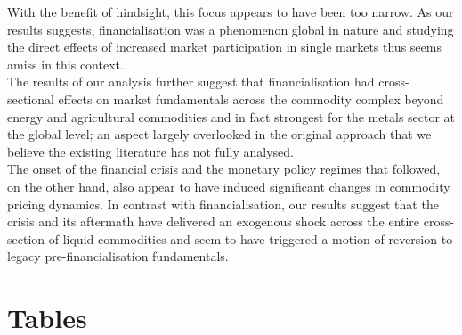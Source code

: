 \documentclass[
  authoryear,
  preprint,
  3p]{elsarticle}
\begin{document}
\medskip

With the benefit of hindsight, this focus appears to have been too
narrow. As our results suggests, financialisation was a phenomenon
global in nature and studying the direct effects of increased market
participation in single markets thus seems amiss in this context.\\
The results of our analysis further suggest that financialisation had
cross-sectional effects on market fundamentals across the commodity
complex beyond energy and agricultural commodities and in fact strongest
for the metals sector at the global level; an aspect largely overlooked
in the original approach that we believe the existing literature has not
fully analysed.\\
The onset of the financial crisis and the monetary policy regimes that
followed, on the other hand, also appear to have induced significant
changes in commodity pricing dynamics. In contrast with
financialisation, our results suggest that the crisis and its aftermath
have delivered an exogenous shock across the entire cross-section of
liquid commodities and seem to have triggered a motion of reversion to
legacy pre-financialisation fundamentals.

\newpage

\section{Tables}\label{tables}

\begingroup\fontsize{7}{9}\selectfont
\end{document}

